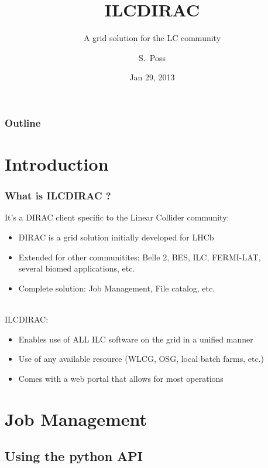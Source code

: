 \documentclass[10pt,table,dvipsnames]{beamer}
\author{S.~Poss}
\title{ILCDIRAC}
\subtitle{A grid solution for the LC community}
\date{Jan 29, 2013}
\institute{CERN, LAPP}
\begin{document}
\renewcommand{\inserttotalframenumber}{\ref{lastframe}}

\begin{frame}
\titlepage
\end{frame}

\begin{frame}
\frametitle{Outline}
\tableofcontents
\end{frame}

\section{Introduction}\label{sec:intro}
\begin{frame}
  \frametitle{What is ILCDIRAC ?}
It's a \alert{DIRAC client} specific to the Linear Collider community:
\begin{itemize}
\item DIRAC is a {\color{NavyBlue}grid solution} initially developed for LHCb
\item Extended for {\color{NavyBlue}other communitites}: Belle 2, BES, ILC, FERMI-LAT,\\
  several biomed applications, etc.
\item \alert{Complete solution}: Job Management, File catalog, etc.
\end{itemize}
~\\
ILCDIRAC:
\begin{itemize}
\item Enables use of {\color{NavyBlue}ALL ILC software} on the grid in a {\color{NavyBlue}unified manner}
\item Use of {\color{NavyBlue}any available resource} (WLCG, OSG, local batch farms,
  etc.)
\item Comes with a {\color{NavyBlue}web portal} that allows for most operations
\end{itemize}
\end{frame}

\section{Job Management}
\label{sec:jobman}

\subsection{Using the python API}
\label{sec:api}
\end{document}
